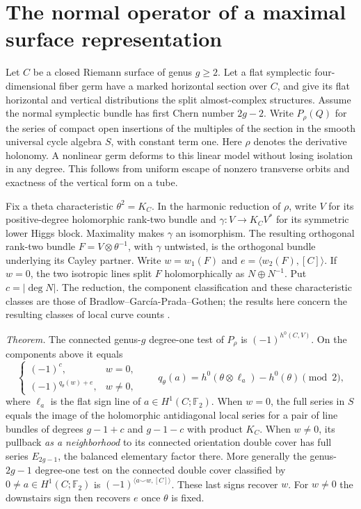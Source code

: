 \section{The normal operator of a maximal surface representation}\label{sec:cayley}
Let \(C\) be a closed Riemann surface of genus \(g\ge2\). Let a flat symplectic four-dimensional fiber germ have a marked horizontal section over \(C\), and give its flat horizontal and vertical distributions the split almost-complex structures. Assume the normal symplectic bundle has first Chern number \(2g-2\). Write \(P_\rho(Q)\) for the series of compact open insertions of the multiples of the section in the smooth universal cycle algebra \(S\), with constant term one. Here \(\rho\) denotes the derivative holonomy. A nonlinear germ deforms to this linear model without losing isolation in any degree. This follows from uniform escape of nonzero transverse orbits and exactness of the vertical form on a tube.

Fix a theta characteristic \(\theta^2=K_C\). In the harmonic reduction of \(\rho\), write \(V\) for its positive-degree holomorphic rank-two bundle and \(\gamma:V\longrightarrow K_C V^*\) for its symmetric lower Higgs block. Maximality makes \(\gamma\) an isomorphism. The resulting orthogonal rank-two bundle \(F=V\otimes\theta^{-1}\), with \(\gamma\) untwisted, is the orthogonal bundle underlying its Cayley partner. Write \(w=w_1(F)\) and \(e=\langle w_2(F),[C]\rangle\). If \(w=0\), the two isotropic lines split \(F\) holomorphically as \(N\oplus N^{-1}\). Put \(c=|\deg N|\). The reduction, the component classification and these characteristic classes are those of Bradlow--García-Prada--Gothen; the results here concern the resulting classes of local curve counts \cite{bgg}.

\emph{Theorem.} The connected genus-\(g\) degree-one test of \(P_\rho\) is \((-1)^{h^0(C,V)}\). On the components above it equals
\[\begin{cases}
 (-1)^c,&w=0,\\
 (-1)^{q_\theta(w)+e},&w\ne0,
 \end{cases}
 \qquad
 q_\theta(a)=h^0(\theta\otimes\ell_a)-h^0(\theta)\pmod2 ,\]
where \(\ell_a\) is the flat sign line of \(a\in H^1(C;\mathbb F_2)\). When \(w=0\), the full series in \(S\) equals the image of the holomorphic antidiagonal local series for a pair of line bundles of degrees \(g-1+c\) and \(g-1-c\) with product \(K_C\). When \(w\ne0\), its pullback \emph{as a neighborhood} to its connected orientation double cover has full series \(E_{2g-1}\), the balanced elementary factor there. More generally the genus-\(2g-1\) degree-one test on the connected double cover classified by \(0\ne a\in H^1(C;\mathbb F_2)\) is \((-1)^{\langle a\smile w,[C]\rangle}\). These last signs recover \(w\). For \(w\ne0\) the downstairs sign then recovers \(e\) once \(\theta\) is fixed.

